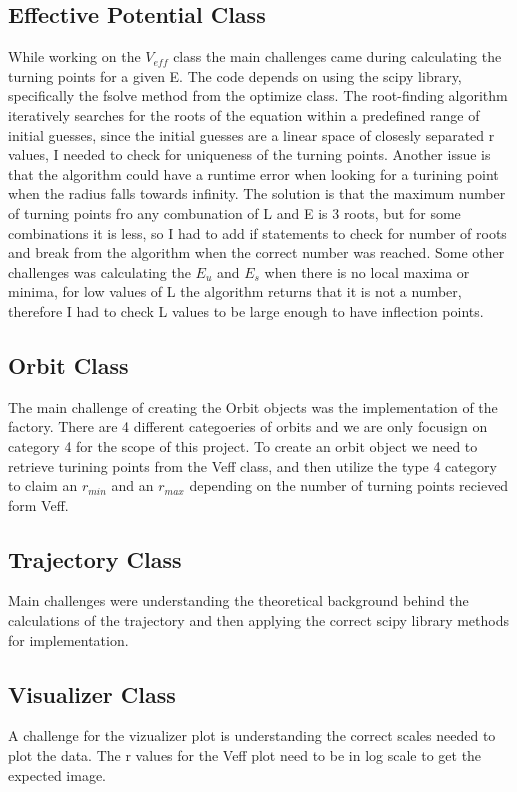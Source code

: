 \documentclass{article}
\begin{document}
\subsection{Effective Potential Class}
While working on the $V_{eff}$ class the main challenges came during calculating the turning points for a given E. The code depends on using the scipy library, specifically the fsolve method from the optimize class. The root-finding algorithm iteratively searches for the roots of the equation within a predefined range of initial guesses, since the initial guesses are a linear space of closesly separated r values, I needed to check for uniqueness of the turning points. Another issue is that the algorithm could have a runtime error when looking for a turining point when the radius falls towards infinity. The solution is that the maximum number of turning points fro any combunation of L and E is 3 roots, but for some combinations it is less, so I had to add if statements to check for number of roots and break from the algorithm when the correct number was reached. Some other challenges was calculating the $E_u$ and $E_s$ when there is no local maxima or minima, for low values of L the algorithm returns that it is not a number, therefore I had to check L values to be large enough to have inflection points.

\subsection{Orbit Class}
The main challenge of creating the Orbit objects was the implementation of the factory. There are 4 different categoeries of orbits and we are only focusign on category 4 for the scope of this project. To create an orbit object we need to retrieve turining points from the Veff class, and then utilize the type 4 category to claim an $r_{min}$ and an $r_{max}$ depending on the number of turning points recieved form Veff.

\subsection{Trajectory Class}
Main challenges were understanding the theoretical background behind the calculations of the trajectory and then applying the correct scipy library methods for implementation.

\subsection{Visualizer Class}
A challenge for the vizualizer plot is understanding the correct scales needed to plot the data. The r values for the Veff plot need to be in log scale to get the expected image.
\end{document}
